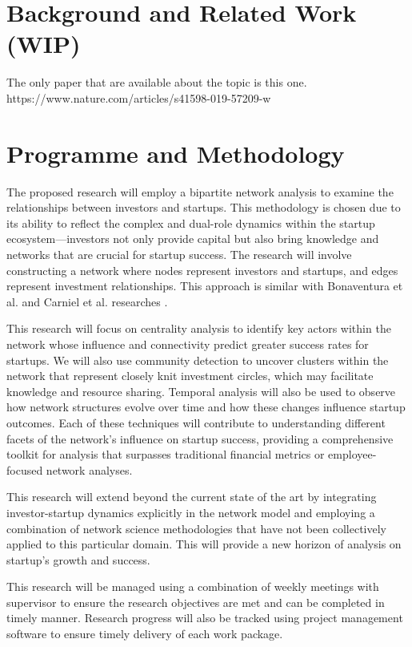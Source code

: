 \documentclass[a4paper,11pt]{article}
\begin{document}
\section{Background and Related Work (WIP)}

The only paper that are available about the topic is this one. https://www.nature.com/articles/s41598-019-57209-w


\section{Programme and Methodology}
The proposed research will employ a bipartite network analysis to examine the relationships between investors and startups. This methodology is chosen due to its ability to reflect the complex and dual-role dynamics within the startup ecosystem—investors not only provide capital but also bring knowledge and networks that are crucial for startup success. The research will involve constructing a network where nodes represent investors and startups, and edges represent investment relationships. This approach is similar with Bonaventura et al. \cite{bonaventura2020a} and Carniel et al. researches \cite{carniel2023a}.

This research will focus on centrality analysis to identify key actors within the network whose influence and connectivity predict greater success rates for startups. We will also use community detection to uncover clusters within the network that represent closely knit investment circles, which may facilitate knowledge and resource sharing. Temporal analysis will also be used to observe how network structures evolve over time and how these changes influence startup outcomes. Each of these techniques will contribute to understanding different facets of the network's influence on startup success, providing a comprehensive toolkit for analysis that surpasses traditional financial metrics or employee-focused network analyses.

This research will extend beyond the current state of the art by integrating investor-startup dynamics explicitly in the network model and employing a combination of network science methodologies that have not been collectively applied to this particular domain. This will provide a new horizon of analysis on startup's growth and success.

This research will be managed using a combination of weekly meetings with supervisor to ensure the research objectives are met and can be completed in timely manner. Research progress will also be tracked using project management software to ensure timely delivery of each work package.
\end{document}
